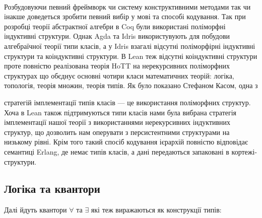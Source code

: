 \documentclass[11pt,oneside]{article}
\begin{document}
    \paragraph{}
    Розбудовуючи певний фреймворк чи систему конструктивними методами
    так чи інакше доведеться зробити певний вибір у мові та способі кодування.
    Так при розробці теорії абстрактної алгебри в Coq були використані
    поліморфні індуктивні структури\cite{coqalg}. Однак Agda та Idris використувують
    для побудови алгебраїчної теорії типи класів, а у Idris взагалі відсутні
    поліморфірні індуктивні структури та коіндуктивні структури. В Lean
    теж відсутні коіндуктивні структури проте повністю реалізована теорія
    HoTT на нерекурсивних поліморфних структурах що обєднує основні чотири
    класи математичних теорій: логіка, топологія, теорія множин, теорія типів.
    Як було показано Стефаном Касом\cite{kaes}, одна з

    стратегій імплементації типів класів --- це використання поліморфних структур.
    Хоча в Lean також підтримуються типи класів нами була вибрана стратегія
    імплементації нашої теорії з використаннями нерекурсивних індуктивних структур,
    що дозволить нам оперувати з персистентними структурами на низькому рівні.
    Крім того такий спосіб кодування ієрархій повністю відповідає семантиці Erlang,
    де немає типів класів, а дані передаються запаковані в кортежі-структури.

    \subsection{Логіка та квантори}

    Далі йдуть квантори $\forall$ та $\exists$ які теж виражаються як конструкції типів:

\begingroup
\parbox[t][][l]{0.40\textwidth}{

\begin{prooftree}
\end{prooftree}

\begin{prooftree}
\end{prooftree}

}
\hspace{0.1cm}
\parbox[t][][r]{0.60\textwidth}{

\begin{prooftree}
\end{prooftree}


\begin{prooftree}
\end{prooftree}

}
\endgroup
\end{document}
